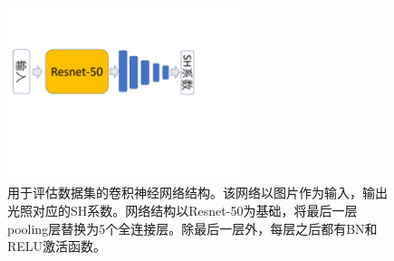 \begin{figure}[!htbp]
    \centering
    \includegraphics[width=0.6\textwidth]{Img/data-network.pdf}
    \caption[用于评估数据集的卷积神经网络结构]
    {用于评估数据集的卷积神经网络结构。该网络以图片作为输入，输出光照对应的SH系数。网络结构以Resnet-50\cite{he2016deep}为基础，将最后一层pooling层替换为5个全连接层。除最后一层外，每层之后都有BN和RELU激活函数。}
    \label{fig:data-network}
\end{figure}